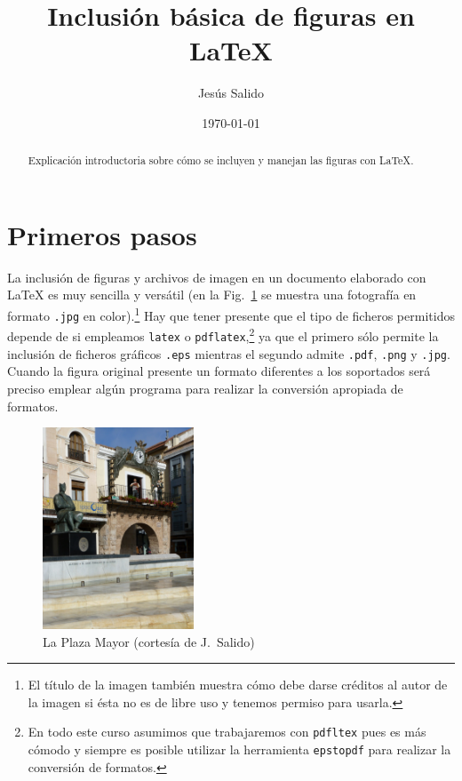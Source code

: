 \documentclass[11pt,a4paper]{article}
\author{Jesús Salido}
\title{Inclusión básica de figuras en \LaTeX{}}
\date{\today}
\begin{document}
\maketitle

\begin{abstract}
	Explicación introductoria sobre cómo se incluyen y manejan las figuras con \LaTeX{}.
\end{abstract}

\tableofcontents
\listoffigures


\section{Primeros pasos}
La inclusión de figuras y archivos de imagen en un documento elaborado con \LaTeX{} es muy sencilla y versátil (en la Fig.~\ref{fig:plazaCR} se muestra una fotografía en formato \texttt{.jpg} en color).\footnote{El título de la imagen también muestra cómo debe darse créditos al autor de la imagen si ésta no es de libre uso y tenemos permiso para usarla.} Hay que tener presente que el tipo de ficheros permitidos depende de si empleamos \texttt{latex} o \texttt{pdflatex},\footnote{En todo este curso asumimos que trabajaremos con \texttt{pdfltex} pues es más cómodo y siempre es posible utilizar la herramienta \texttt{epstopdf} para realizar la conversión de formatos.} ya que el primero sólo permite la inclusión de ficheros gráficos \texttt{.eps} mientras el segundo admite \texttt{.pdf}, \texttt{.png} y \texttt{.jpg}. Cuando la figura original presente un formato diferentes a los soportados será preciso emplear algún programa para realizar la conversión apropiada de formatos.



\begin{figure}[htb] %
	\centering %
	\includegraphics[height=6cm]{plazaCR} %
	\caption[Ejemplo de foto en formato jpg]{La Plaza Mayor (cortesía de J.~Salido)} %
	\label{fig:plazaCR} %
\end{figure}
\end{document}
